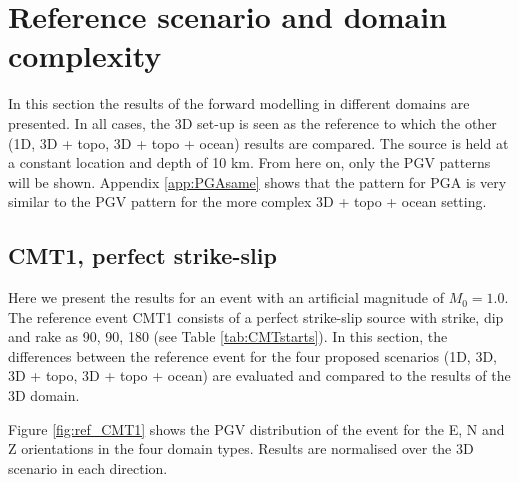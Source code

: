 \documentclass[../Text/00main.tex]{subfiles}
\begin{document}
\FloatBarrier


\section{Reference scenario and domain complexity}

In this section the results of the forward modelling in different domains are presented. In all cases, the 3D set-up is seen as the reference to which the other (1D, 3D + topo, 3D + topo + ocean) results are compared. The source is held at a constant location and depth of 10 km. From here on, only the PGV patterns will be shown. Appendix \ref{app:PGAsame} shows that the pattern for PGA is very similar to the PGV pattern for the more complex 3D + topo + ocean setting. 

\subsection{CMT1, perfect strike-slip}

Here we present the results for an event with an artificial magnitude of $M_0 = 1.0$. The reference event CMT1 consists of a perfect strike-slip source with strike, dip and rake as 90, 90, 180 (see Table \ref{tab:CMTstarts}). In this section, the differences between the reference event for the four proposed scenarios (1D, 3D, 3D + topo, 3D + topo + ocean) are evaluated and compared to the results of the 3D domain. 

Figure \ref{fig:ref_CMT1} shows the PGV distribution of the event for the E, N and Z orientations in the four domain types. Results are normalised over the 3D scenario in each direction. 
\end{document}

